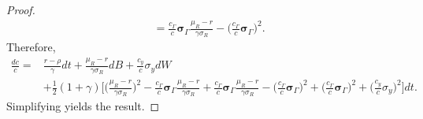 \documentclass[11pt]{extarticle}
\theoremstyle{plain}
\theoremstyle{definition}
\begin{document}
\begin{enumerate}[(a)]
\begin{proof}
\begin{align*}
		&= \frac{c_\Gamma }{c}  \bm \sigma_\Gamma \frac{\mu_R - r}{\gamma \sigma_R } -\bigg( \frac{c_\Gamma}{c}  \bm \sigma_\Gamma  \bigg)^2.
	\end{align*}
	Therefore, 
	\begin{align*}
		\frac{dc}{c} = & \frac{r - \rho}{\gamma} dt +  \frac{\mu_R - r}{\gamma \sigma_R} dB  + \frac{c_y}{c} \sigma_y dW \\
		&+ \frac{1}{2} (1+\gamma) \bigg[ \bigg( \frac{\mu_R - r}{\gamma \sigma_R} \bigg)^2  - \frac{c_\Gamma }{c} \bm \sigma_\Gamma \frac{\mu_R - r}{\gamma \sigma_R} + \frac{c_\Gamma }{c}  \bm \sigma_\Gamma \frac{\mu_R - r}{\gamma \sigma_R } -\bigg( \frac{c_\Gamma}{c}  \bm \sigma_\Gamma  \bigg)^2 + \bigg( \frac{c_\Gamma}{c} \bm \sigma_\Gamma \bigg)^2 + \bigg( \frac{c_y}{c} \sigma_y \bigg)^2 \bigg] dt.
	\end{align*}
	Simplifying yields the result. 
	
\end{proof}






\end{enumerate}


\vspace{10mm}
\end{document}
